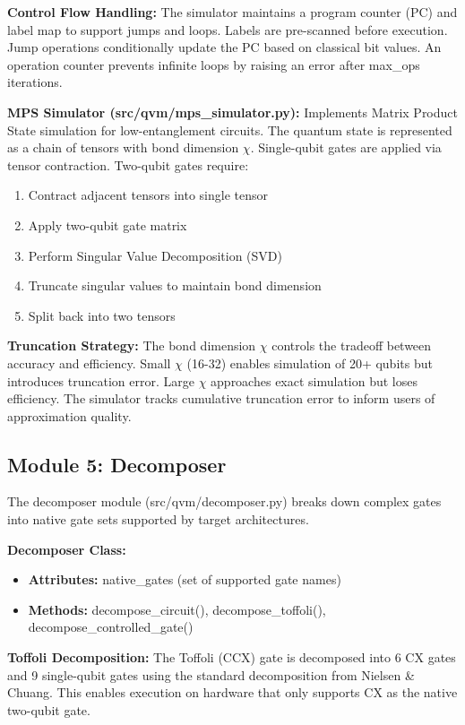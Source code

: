 \textbf{Control Flow Handling:}
The simulator maintains a program counter (PC) and label map to support jumps and loops. Labels are pre-scanned before execution. Jump operations conditionally update the PC based on classical bit values. An operation counter prevents infinite loops by raising an error after max\_ops iterations.

\textbf{MPS Simulator (src/qvm/mps\_simulator.py):}
Implements Matrix Product State simulation for low-entanglement circuits. The quantum state is represented as a chain of tensors with bond dimension $\chi$. Single-qubit gates are applied via tensor contraction. Two-qubit gates require:
\begin{enumerate}
\item Contract adjacent tensors into single tensor
\item Apply two-qubit gate matrix
\item Perform Singular Value Decomposition (SVD)
\item Truncate singular values to maintain bond dimension
\item Split back into two tensors
\end{enumerate}

\textbf{Truncation Strategy:}
The bond dimension $\chi$ controls the tradeoff between accuracy and efficiency. Small $\chi$ (16-32) enables simulation of 20+ qubits but introduces truncation error. Large $\chi$ approaches exact simulation but loses efficiency. The simulator tracks cumulative truncation error to inform users of approximation quality.

\subsection{Module 5: Decomposer}
The decomposer module (src/qvm/decomposer.py) breaks down complex gates into native gate sets supported by target architectures.

\textbf{Decomposer Class:}
\begin{itemize}
\item \textbf{Attributes:} native\_gates (set of supported gate names)
\item \textbf{Methods:} decompose\_circuit(), decompose\_toffoli(), decompose\_controlled\_gate()
\end{itemize}

\textbf{Toffoli Decomposition:}
The Toffoli (CCX) gate is decomposed into 6 CX gates and 9 single-qubit gates using the standard decomposition from Nielsen \& Chuang. This enables execution on hardware that only supports CX as the native two-qubit gate.

